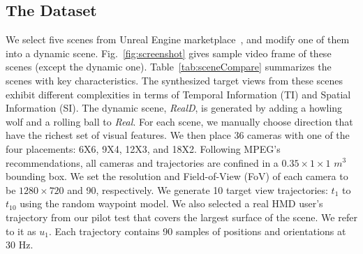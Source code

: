 \subsection{The Dataset} \label{ssec:dataset}
We select five scenes from Unreal Engine marketplace~\cite{UE_marketplace}, and modify one of them into a dynamic scene. 
Fig.~\ref{fig:screenshot} gives sample video frame of these scenes (except the dynamic one). 
Table~\ref{tab:sceneCompare} summarizes the scenes with key characteristics. 
The synthesized target views from these scenes exhibit different complexities in terms of Temporal Information (TI) and Spatial Information (SI). The dynamic scene, {\em RealD}, is generated by adding a howling wolf and a rolling ball to {\em Real}. For each scene, we manually choose direction that have the richest set of visual features. We then place 36 cameras with one of the four placements: 6X6, 9X4, 12X3, and 18X2. Following MPEG's recommendations, all cameras and trajectories are confined in a $0.35 \times 1 \times 1$ $m^{3}$ bounding box. We set the resolution and Field-of-View (FoV) of each camera to be $1280 \times 720$ and 90{\degree}, respectively. We generate 10 target view trajectories: $t_1$ to $t_{10}$ using the random waypoint model. We also selected a real HMD user's trajectory from our pilot test that covers the largest surface of the scene. We refer to it as $u_1$. Each trajectory contains 90 samples of positions and orientations at 30 Hz. 

\begin{table}[hbt]
    \caption{Scenes in Our Dataset}
    \centering
    \label{tab:sceneCompare}
\end{table}

